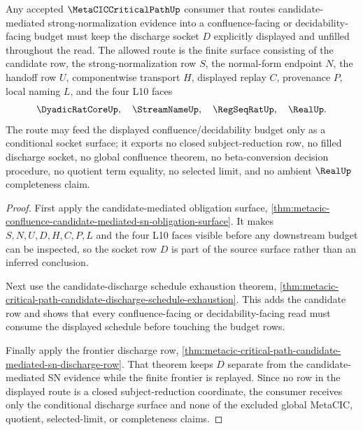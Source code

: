 \begin{theorem}
\label{thm:metacic-critical-path-candidate-mediated-sn-discharge}
Any accepted $\MetaCICCriticalPathUp$ consumer that routes candidate-mediated strong-normalization evidence into a confluence-facing or decidability-facing budget must keep the discharge socket $D$ explicitly displayed and unfilled throughout the read. The allowed route is the finite surface consisting of the candidate row, the strong-normalization row $S$, the normal-form endpoint $N$, the handoff row $U$, componentwise transport $H$, displayed replay $C$, provenance $P$, local naming $L$, and the four L10 faces
$$
\DyadicRatCoreUp,\quad \StreamNameUp,\quad \RegSeqRatUp,\quad \RealUp .
$$
The route may feed the displayed confluence/decidability budget only as a conditional socket surface; it exports no closed subject-reduction row, no filled discharge socket, no global confluence theorem, no beta-conversion decision procedure, no quotient term equality, no selected limit, and no ambient $\RealUp$ completeness claim.
\end{theorem}
\begin{proof}
First apply the candidate-mediated obligation surface, \autoref{thm:metacic-confluence-candidate-mediated-sn-obligation-surface}. It makes $S,N,U,D,H,C,P,L$ and the four L10 faces visible before any downstream budget can be inspected, so the socket row $D$ is part of the source surface rather than an inferred conclusion.

Next use the candidate-discharge schedule exhaustion theorem, \autoref{thm:metacic-critical-path-candidate-discharge-schedule-exhaustion}. This adds the candidate row and shows that every confluence-facing or decidability-facing read must consume the displayed schedule before touching the budget rows.

Finally apply the frontier discharge row, \autoref{thm:metacic-critical-path-candidate-mediated-sn-discharge-row}. That theorem keeps $D$ separate from the candidate-mediated SN evidence while the finite frontier is replayed. Since no row in the displayed route is a closed subject-reduction coordinate, the consumer receives only the conditional discharge surface and none of the excluded global MetaCIC, quotient, selected-limit, or completeness claims.
\end{proof}

